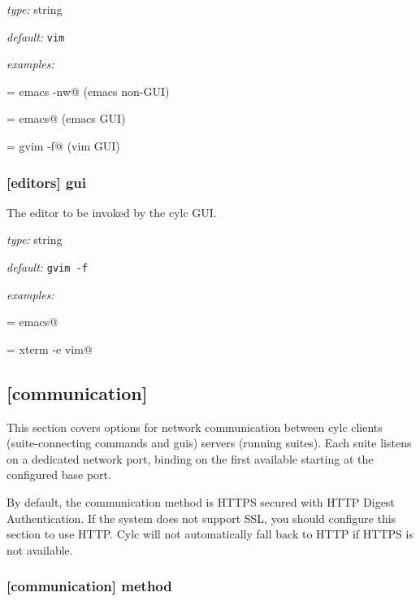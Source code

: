 \begin{myitemize}
\item {\em type:} string
\item {\em default:} \lstinline=vim=
\item {\em examples:}
    \begin{myitemize}
            \item \lstinline@terminal = emacs -nw@ (emacs non-GUI)
            \item \lstinline@terminal = emacs@ (emacs GUI)
            \item \lstinline@terminal = gvim -f@ (vim GUI)
    \end{myitemize}
\end{myitemize}

\subsubsection[gui]{[editors] \textrightarrow gui}

The editor to be invoked by the cylc GUI.

\begin{myitemize}
\item {\em type:} string
\item {\em default:} \lstinline=gvim -f=
\item {\em examples:}
    \begin{myitemize}
            \item \lstinline@gui = emacs@
            \item \lstinline@gui = xterm -e vim@
    \end{myitemize}
\end{myitemize}


\subsection{[communication]}

This section covers options for network communication between cylc
clients (suite-connecting commands and guis) servers (running suites).
Each suite listens on a dedicated network port, binding on the first
available starting at the configured base port.

By default, the communication method is HTTPS secured with HTTP Digest
Authentication. If the system does not support SSL, you should configure
this section to use HTTP. Cylc will not automatically fall back to HTTP
if HTTPS is not available.

\subsubsection[method]{[communication] \textrightarrow method }

